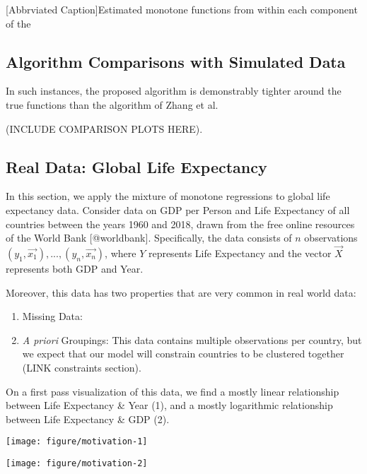 \documentclass[fleqn,10pt]{olplainarticle}\usepackage[]{graphicx}\usepackage[]{color}
\makeatletter
\def\maxwidth{ %
  \ifdim\Gin@nat@width>\linewidth
    \linewidth
  \else
    \Gin@nat@width
  \fi
}
\newenvironment{knitrout}{}{} %
\makeatother
\begin{document}
\begin{minipage}{0.8\textwidth}

[Abbrviated Caption]{Estimated monotone functions from within each component of the}
\end{minipage}


\subsection{Algorithm Comparisons with Simulated Data}

In such instances, the proposed algorithm is demonstrably tighter around the true functions than the algorithm of Zhang et al. 

(INCLUDE COMPARISON PLOTS HERE).



\subsection{Real Data: Global Life Expectancy }

In this section, we apply the mixture of monotone regressions to global life expectancy data. Consider data on GDP per Person and Life Expectancy of all countries between the years 1960 and 2018, drawn from the free online resources of the World Bank [@worldbank]. Specifically, the data consists of $n$ observations $(y_1, \vec{x_1}),...,(y_n,\vec{x_n})$, where $Y$ represents Life Expectancy and the vector $\vec{X}$ represents both GDP and Year. 

Moreover, this data has two properties that are very common in real world data:
\begin{enumerate}[noitemsep] 
  \item Missing Data: 
  \item \emph{A priori} Groupings: This data contains multiple observations per country, but we expect that our model will constrain countries to be clustered together (LINK constraints section). 
\end{enumerate}

On a first pass visualization of this data, we find a mostly linear relationship between Life Expectancy \& Year (1), and a mostly logarithmic relationship between Life Expectancy \& GDP (2). 

\begin{knitrout}
\color{fgcolor}

{\centering \texttt{[image: figure/motivation-1]} 

}




{\centering \texttt{[image: figure/motivation-2]} 

}



\end{knitrout}
\end{document}
